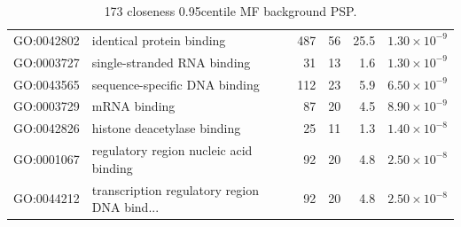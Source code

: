 \begin{table}[ht]
\begin{tabular}{llrrrr}
  GO:0042802 & identical protein binding & 487 & 56 & 25.5 & $1.30 \times 10^{-9}$ \\ 
  GO:0003727 & single-stranded RNA binding & 31 & 13 & 1.6 & $1.30 \times 10^{-9}$ \\ 
  GO:0043565 & sequence-specific DNA binding & 112 & 23 & 5.9 & $6.50 \times 10^{-9}$ \\ 
  GO:0003729 & mRNA binding & 87 & 20 & 4.5 & $8.90 \times 10^{-9}$ \\ 
  GO:0042826 & histone deacetylase binding & 25 & 11 & 1.3 & $1.40 \times 10^{-8}$ \\ 
  GO:0001067 & regulatory region nucleic acid binding & 92 & 20 & 4.8 & $2.50 \times 10^{-8}$ \\ 
  GO:0044212 & transcription regulatory region DNA bind... & 92 & 20 & 4.8 & $2.50 \times 10^{-8}$ \\ 
   \hline
\end{tabular}
\caption{173 closeness 0.95centile  MF background PSP.} 
\label{tab:173 closeness 0.95centile  MF background PSP.}
\end{table}



